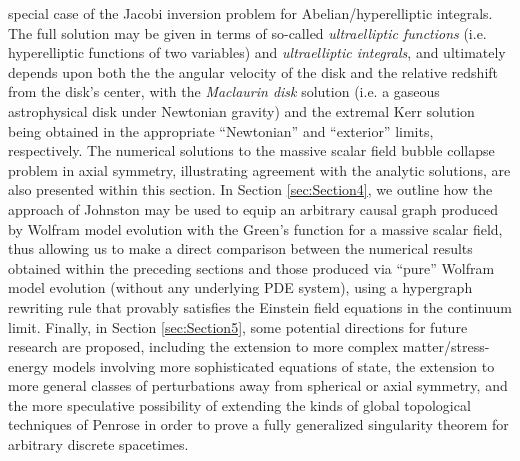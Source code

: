 \documentclass{article}
\begin{document}
special case of the Jacobi inversion problem for Abelian/hyperelliptic integrals. The full solution may be given in terms of so-called \textit{ultraelliptic functions} (i.e. hyperelliptic functions of two variables) and \textit{ultraelliptic integrals}, and ultimately depends upon both the the angular velocity of the disk and the relative redshift from the disk's center, with the \textit{Maclaurin disk} solution (i.e. a gaseous astrophysical disk under Newtonian gravity) and the extremal Kerr solution being obtained in the appropriate ``Newtonian'' and ``exterior'' limits, respectively. The numerical solutions to the massive scalar field bubble collapse problem in axial symmetry, illustrating agreement with the analytic solutions, are also presented within this section. In Section \ref{sec:Section4}, we outline how the approach of Johnston may be used to equip an arbitrary causal graph produced by Wolfram model evolution with the Green's function for a massive scalar field, thus allowing us to make a direct comparison between the numerical results obtained within the preceding sections and those produced via ``pure'' Wolfram model evolution (without any underlying PDE system), using a hypergraph rewriting rule that provably satisfies the Einstein field equations in the continuum limit. Finally, in Section \ref{sec:Section5}, some potential directions for future research are proposed, including the extension to more complex matter/stress-energy models involving more sophisticated equations of state, the extension to more general classes of perturbations away from spherical or axial symmetry, and the more speculative possibility of extending the kinds of global topological techniques of Penrose in order to prove a fully generalized singularity theorem for arbitrary discrete spacetimes.
\end{document}
